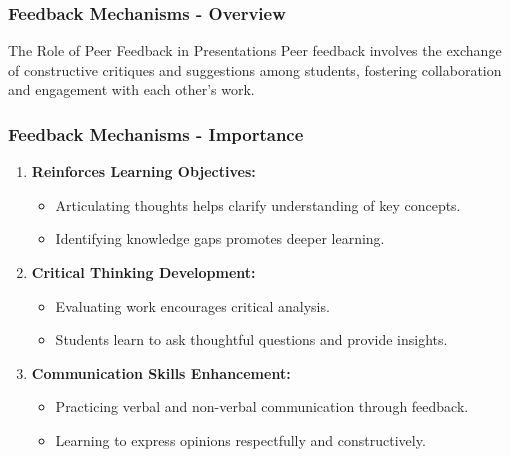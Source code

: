 \documentclass{beamer}
\begin{document}
\begin{frame}[fragile]
    \frametitle{Feedback Mechanisms - Overview}
    \begin{block}{The Role of Peer Feedback in Presentations}
        Peer feedback involves the exchange of constructive critiques and suggestions among students, fostering collaboration and engagement with each other's work.
    \end{block}
\end{frame}

\begin{frame}[fragile]
    \frametitle{Feedback Mechanisms - Importance}
    \begin{enumerate}
        \item \textbf{Reinforces Learning Objectives:}
        \begin{itemize}
            \item Articulating thoughts helps clarify understanding of key concepts.
            \item Identifying knowledge gaps promotes deeper learning.
        \end{itemize}
        
        \item \textbf{Critical Thinking Development:}
        \begin{itemize}
            \item Evaluating work encourages critical analysis.
            \item Students learn to ask thoughtful questions and provide insights.
        \end{itemize}
        
        \item \textbf{Communication Skills Enhancement:}
        \begin{itemize}
            \item Practicing verbal and non-verbal communication through feedback.
            \item Learning to express opinions respectfully and constructively.
        \end{itemize}
    \end{enumerate}
\end{frame}
\end{document}
